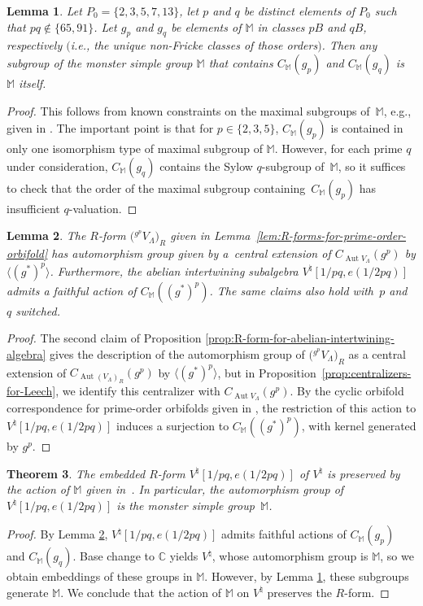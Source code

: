 \documentclass[11pt]{article}
\newcommand{\bC}{\mathbb{C}}
\newcommand{\bM}{\mathbb{M}}
\DeclareMathOperator{\Aut}{Aut}
\newtheorem{thm}{Theorem}[section]
\newtheorem{lem}[thm]{Lemma}
\theoremstyle{definition}
\begin{document}
\begin{lem} \label{lem:maximal-subgroups-of-monster}
Let $P_0 = \{ 2,3,5,7,13\}$, let $p$ and $q$ be distinct elements of $P_0$ such that $pq \not\in \{65, 91\}$. Let $g_p$ and $g_q$ be elements of $\bM$ in classes $pB$ and $qB$, respectively $($i.e., the unique non-Fricke classes of those orders$)$. Then any subgroup of the monster simple group $\bM$ that contains $C_\bM(g_p)$ and $C_\bM(g_q)$ is $\bM$ itself.
\end{lem}
\begin{proof}This follows from known constraints on the maximal subgroups of~$\bM$, e.g., given in \cite{W17}. The important point is that for $p \in \{2,3,5\}$, $C_\bM(g_p)$ is contained in only one isomorphism type of maximal subgroup of $\bM$. However, for each prime $q$ under consideration, $C_\bM(g_q)$ contains the Sylow $q$-subgroup of~$\bM$, so it suffices to check that the order of the maximal subgroup containing~$C_\bM(g_p)$ has insufficient $q$-valuation.
\end{proof}

\begin{lem} \label{lem:action-of-centralizer-on-R-form}The $R$-form $\big({}^{g^p}V_\Lambda\big)_R$ given in Lemma~{\rm \ref{lem:R-forms-for-prime-order-orbifold}} has automorphism group given by a~central extension of $C_{\Aut V_\Lambda}(g^p)$ by $\langle (g^*)^p \rangle$. Furthermore, the abelian intertwining subalgebra $V^\natural[1/pq,e(1/2pq)]$ admits a faithful action of $C_\bM((g^*)^p)$. The same claims also hold with~$p$ and~$q$ switched.
\end{lem}
\begin{proof}The second claim of Proposition \ref{prop:R-form-for-abelian-intertwining-algebra} gives the description of the automorphism group of $\big({}^{g^p}V_\Lambda\big)_R$ as a central extension of $C_{\Aut (V_\Lambda)_R}(g^p)$ by $\langle (g^*)^p \rangle$, but in Proposition~\ref{prop:centralizers-for-Leech}, we identify this centralizer with $C_{\Aut V_\Lambda}(g^p)$. By the cyclic orbifold correspondence for prime-order orbifolds given in \cite{ALY17}, the restriction of this action to $V^\natural[1/pq,e(1/2pq)]$ induces a surjection to $C_\bM((g^*)^p)$, with kernel generated by $g^p$.
\end{proof}

\begin{thm} \label{thm:monster-form}The embedded $R$-form $V^\natural[1/pq,e(1/2pq)]$ of $V^\natural$ is preserved by the action of $\bM$ given in~{\rm \cite{FLM88}}. In particular, the automorphism group of $V^\natural[1/pq,e(1/2pq)]$ is the monster simple group~$\bM$.
\end{thm}
\begin{proof}
By Lemma \ref{lem:action-of-centralizer-on-R-form}, $V^\natural[1/pq,e(1/2pq)]$ admits faithful actions of $C_\bM(g_p)$ and $C_\bM(g_q)$. Base change to $\bC$ yields $V^\natural$, whose automorphism group is $\bM$, so we obtain embeddings of these groups in $\bM$. However, by Lemma \ref{lem:maximal-subgroups-of-monster}, these subgroups generate $\bM$. We conclude that the action of $\bM$ on $V^\natural$ preserves the $R$-form.
\end{proof}
\end{document}
